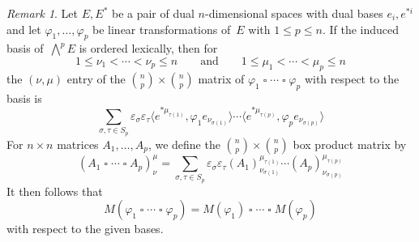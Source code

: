 \documentclass[letterpaper,12pt]{article}
\newcommand{\bigeprod}{\bigwedge}
\newcommand{\medeprod}{{\textstyle\bigeprod}}
\newcommand{\bprod}{\mathbin{\square}}
\newcommand{\sprod}[2]{\langle#1,#2\rangle}
\newcommand{\multi}[4]{#2_{#3}#1\cdots#1#2_{#4}}
\newcommand{\bprods}[3]{\multi{\bprod}{#1}{#2}{#3}}
\newcommand{\sign}[1]{\varepsilon_{#1}}
\theoremstyle{definition}
\theoremstyle{remark}
\newtheorem*{rmk}{Remark}
\begin{document}
\begin{rmk}
Let \(E,E^*\) be a pair of dual \(n\)-dimensional spaces with dual bases \(e_i,e^{*i}\) and let \(\varphi_1,\ldots,\varphi_p\) be linear transformations of~\(E\) with \(1\le p\le n\). If the induced basis of~\(\medeprod^p E\) is ordered lexically, then for
\[1\le\nu_1<\cdots<\nu_p\le n\qquad\text{and}\qquad 1\le\mu_1<\cdots<\mu_p\le n\]
the \((\nu,\mu)\) entry of the \(\binom{n}{p}\times\binom{n}{p}\) matrix of \(\bprods{\varphi}{1}{p}\) with respect to the basis is
\[\sum_{\sigma,\tau\in S_p}\sign{\sigma}\sign{\tau}\sprod{e^{*\mu_{\tau(1)}}}{\varphi_1e_{\nu_{\sigma(1)}}}\cdots\sprod{e^{*\mu_{\tau(p)}}}{\varphi_pe_{\nu_{\sigma(p)}}}\]
For \(n\times n\) matrices \(A_1,\ldots,A_p\), we define the \(\binom{n}{p}\times\binom{n}{p}\) box product matrix by
\[(\bprods{A}{1}{p})^{\mu}_{\nu}=\sum_{\sigma,\tau\in S_p}\sign{\sigma}\sign{\tau}(A_1)^{\mu_{\tau(1)}}_{\nu_{\sigma(1)}}\cdots(A_p)^{\mu_{\tau(p)}}_{\nu_{\sigma(p)}}\]
It then follows that
\[M(\bprods{\varphi}{1}{p})=M(\varphi_1)\bprod\cdots\bprod M(\varphi_p)\]
with respect to the given bases.
\end{rmk}
\end{document}
